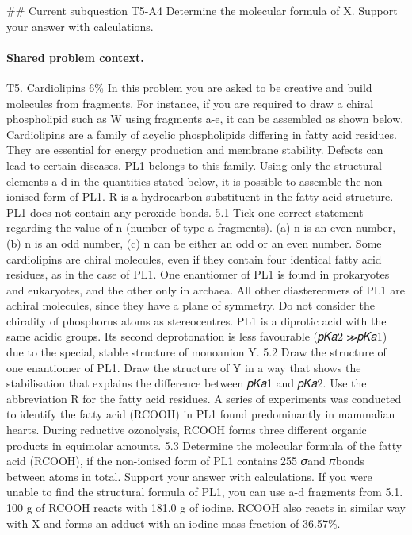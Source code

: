 \#\# Current subquestion T5-A4
Determine the molecular formula of X. Support your answer with calculations.

\paragraph{Shared problem context.}
T5. Cardiolipins 6\% In this problem you are asked to be creative and build molecules from fragments. For instance, if you are required to draw a chiral phospholipid such as W using fragments a-e, it can be assembled as shown below. Cardiolipins are a family of acyclic phospholipids differing in fatty acid residues. They are essential for energy production and membrane stability. Defects can lead to certain diseases. PL1 belongs to this family. Using only the structural elements a-d in the quantities stated below, it is possible to assemble the non-ionised form of PL1. R is a hydrocarbon substituent in the fatty acid structure. PL1 does not contain any peroxide bonds. 5.1 Tick one correct statement regarding the value of n (number of type a fragments). (a) n is an even number, (b) n is an odd number, (c) n can be either an odd or an even number. Some cardiolipins are chiral molecules, even if they contain four identical fatty acid residues, as in the case of PL1. One enantiomer of PL1 is found in prokaryotes and eukaryotes, and the other only in archaea. All other diastereomers of PL1 are achiral molecules, since they have a plane of symmetry. Do not consider the chirality of phosphorus atoms as stereocentres. PL1 is a diprotic acid with the same acidic groups. Its second deprotonation is less favourable (𝑝𝐾𝑎2 ≫𝑝𝐾𝑎1) due to the special, stable structure of monoanion Y. 5.2 Draw the structure of one enantiomer of PL1. Draw the structure of Y in a way that shows the stabilisation that explains the difference between 𝑝𝐾𝑎1 and 𝑝𝐾𝑎2. Use the abbreviation R for the fatty acid residues. A series of experiments was conducted to identify the fatty acid (RCOOH) in PL1 found predominantly in mammalian hearts. During reductive ozonolysis, RCOOH forms three different organic products in equimolar amounts. 5.3 Determine the molecular formula of the fatty acid (RCOOH), if the non-ionised form of PL1 contains 255 𝜎and 𝜋bonds between atoms in total. Support your answer with calculations. If you were unable to find the structural formula of PL1, you can use a-d fragments from 5.1. 100 g of RCOOH reacts with 181.0 g of iodine. RCOOH also reacts in similar way with X and forms an adduct with an iodine mass fraction of 36.57\%.

